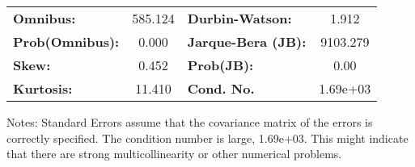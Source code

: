 \begin{center}
\begin{tabular}{lcccccc}
\bottomrule
\end{tabular}
\begin{tabular}{lclc}
\textbf{Omnibus:}       & 585.124 & \textbf{  Durbin-Watson:     } &    1.912  \\
\textbf{Prob(Omnibus):} &   0.000 & \textbf{  Jarque-Bera (JB):  } & 9103.279  \\
\textbf{Skew:}          &   0.452 & \textbf{  Prob(JB):          } &     0.00  \\
\textbf{Kurtosis:}      &  11.410 & \textbf{  Cond. No.          } & 1.69e+03  \\
\bottomrule
\end{tabular}
\end{center}

Notes: \newline
 [1] Standard Errors assume that the covariance matrix of the errors is correctly specified. \newline
 [2] The condition number is large, 1.69e+03. This might indicate that there are \newline
 strong multicollinearity or other numerical problems.
